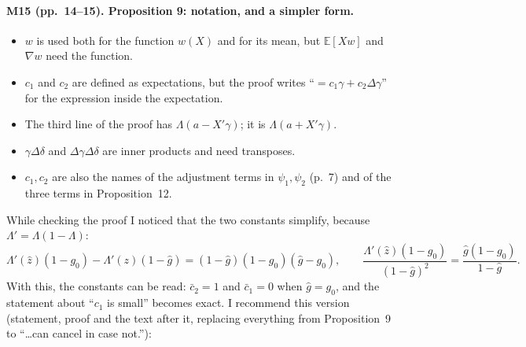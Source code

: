\documentclass[11pt]{article}
\providecommand{\E}{\mathbb{E}}
\theoremstyle{plain}
\theoremstyle{remark}
\begin{document}
\paragraph{M15 (pp.~14--15). Proposition 9: notation, and a simpler form.}
\begin{itemize}
\item $w$ is used both for the function $w(X)$ and for its mean, but
  $\E[Xw]$ and $\nabla w$ need the function.
\item $c_1$ and $c_2$ are defined as expectations, but the proof writes
  ``$=c_1\gamma+c_2\Delta\gamma$'' for the expression inside the expectation.
\item The third line of the proof has $\Lambda(a-X'\gamma)$; it is
  $\Lambda(a+X'\gamma)$.
\item $\gamma\Delta\delta$ and $\Delta\gamma\Delta\delta$ are inner products and
  need transposes.
\item $c_1,c_2$ are also the names of the adjustment terms in $\psi_1,\psi_2$
  (p.~7) and of the three terms in Proposition~12.
\end{itemize}
While checking the proof I noticed that the two constants simplify, because
$\Lambda'=\Lambda(1-\Lambda)$:
\[
  \Lambda'(\hat z)(1-g_0)-\Lambda'(z)(1-\hat g)=(1-\hat g)(1-g_0)(\hat g-g_0),
  \qquad
  \frac{\Lambda'(\hat z)(1-g_0)}{(1-\hat g)^2}=\frac{\hat g(1-g_0)}{1-\hat g}.
\]
With this, the constants can be read: $\bar c_2=1$ and $\bar c_1=0$ when
$\hat g=g_0$, and the statement about ``$c_1$ is small'' becomes exact. I
recommend this version (statement, proof and the text after it, replacing
everything from Proposition~9 to ``\dots can cancel in case not.''):
\end{document}
